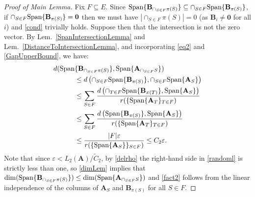 \documentclass[9pt,twocolumn]{pnas-new}
\begin{document}
\begin{proof}[Proof of Main Lemma]
Fix $F \subseteq E$. Since $\text{\rm Span}\{\mathbf{B}_{\cap_{S \in F}\pi(S)}\} \subseteq \cap_{S \in F} \text{\rm Span}\{\mathbf{B}_{\pi(S)}\}$, if $\cap_{S \in F} \text{\rm Span}\{\mathbf{B}_{\pi(S)}\} = \textbf{0}$ then we must have $|\cap_{S \in F} \pi(S)| = 0$ (as $\mathbf{B}_i \neq \textbf{0}$ for all $i$) and \eqref{cond} trivially holds. Suppose then that the intersection is not the zero vector. By Lem.~\ref{SpanIntersectionLemma} and Lem.~\ref{DistanceToIntersectionLemma}, and incorporating \eqref{eq2} and \eqref{GapUpperBound}, we have:
\begin{align}\label{randoml}
d( \text{\rm Span}&\{\mathbf{B}_{\cap_{S \in F}\pi(S)}\}, \text{\rm Span}\{\mathbf{A}_{\cap_{S \in F} S}\}  ) \nonumber \\
&\leq d\left( \cap_{S \in F} \text{\rm Span}\{\mathbf{B}_{\pi(S)}\}, \cap_{S \in F} \text{\rm Span}\{\mathbf{A}_{S}\} \right) \nonumber \\
&\leq \sum_{S \in F} \frac{ d\left( \cap_{T \in F} \text{\rm Span}\{\mathbf{B}_{\pi(T)}\},\text{\rm Span}\{\mathbf{A}_{S}\} \right) }{ r( \{ \text{\rm Span}\{\mathbf{A}_{T}\}_{T \in F}) } \nonumber \\
&\leq \sum_{S \in F} \frac{ d\left( \text{\rm Span}\{\mathbf{B}_{\pi(S)}\},\text{\rm Span}\{\mathbf{A}_{S}\} \right) }{ r( \{ \text{\rm Span}\{\mathbf{A}_{T}\}_{T \in F}) }\nonumber \\
&\leq \frac{|F| \varepsilon}{r( \{ \text{\rm Span}\{\mathbf{A}_{S}\} \}_{S \in F})} 
\leq C_2 \varepsilon. 
\end{align}
Note that since $\varepsilon < L_2(\mathbf{A}) / \tilde C_2$, by \eqref{delrho} the right-hand side in \eqref{randoml} is strictly less than one, so \eqref{dimLem} implies that $\dim(\text{\rm Span}\{\mathbf{B}_{\cap_{S \in F}\pi(S)}\}) \leq \dim(\text{\rm Span}\{\mathbf{A}_{\cap_{S \in F} S}\})$ and \eqref{fact2} follows from the linear independence of the columns of $\mathbf{A}_{S}$ and $\mathbf{B}_{\pi(S)}$ for all $S \in F$.

\end{proof}
\end{document}
